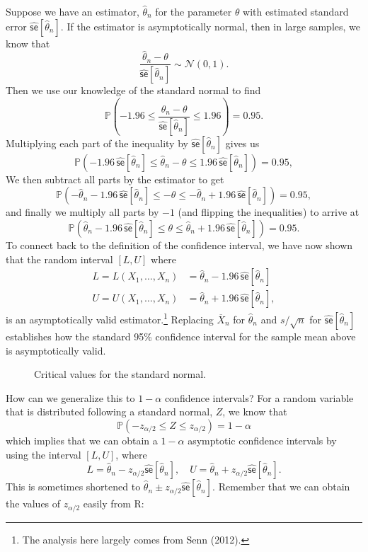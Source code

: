 \documentclass[
  13pt,
  letterpaper,
  DIV=11,
  numbers=noendperiod]{scrreprt}
\newcommand{\N}{\mathcal{N}}
\newcommand{\se}{\textsf{se}}
\renewcommand{\P}{\mathbb{P}}
\newcommand{\Xbar}{\overline{X}}
\theoremstyle{definition}
\theoremstyle{definition}
\theoremstyle{plain}
\theoremstyle{remark}
\begin{document}
Suppose we have an estimator, \(\widehat{\theta}_n\) for the parameter
\(\theta\) with estimated standard error
\(\widehat{\se}[\widehat{\theta}_n]\). If the estimator is
asymptotically normal, then in large samples, we know that \[ 
\frac{\widehat{\theta}_n - \theta}{\widehat{\se}[\widehat{\theta}_n]} \sim \N(0, 1).
\] Then we use our knowledge of the standard normal to find \[ 
\P\left( -1.96 \leq \frac{\widehat{\theta}_n - \theta}{\widehat{\se}[\widehat{\theta}_n]} \leq 1.96\right) = 0.95.
\] Multiplying each part of the inequality by
\(\widehat{\se}[\widehat{\theta}_n]\) gives us \[ 
\P\left( -1.96\,\widehat{\se}[\widehat{\theta}_n] \leq \widehat{\theta}_n - \theta \leq 1.96\,\widehat{\se}[\widehat{\theta}_n]\right) = 0.95,
\] We then subtract all parts by the estimator to get \[ 
\P\left(-\widehat{\theta}_n - 1.96\,\widehat{\se}[\widehat{\theta}_n] \leq - \theta \leq -\widehat{\theta}_n + 1.96\,\widehat{\se}[\widehat{\theta}_n]\right) = 0.95,
\] and finally we multiply all parts by \(-1\) (and flipping the
inequalities) to arrive at \[ 
\P\left(\widehat{\theta}_n - 1.96\,\widehat{\se}[\widehat{\theta}_n] \leq \theta \leq \widehat{\theta}_n + 1.96\,\widehat{\se}[\widehat{\theta}_n]\right) = 0.95.
\] To connect back to the definition of the confidence interval, we have
now shown that the random interval \([L, U]\) where \[ 
\begin{aligned}
  L = L(X_1, \ldots, X_n) &= \widehat{\theta}_n - 1.96\,\widehat{\se}[\widehat{\theta}_n] \\
  U = U(X_1, \ldots, X_n) &= \widehat{\theta}_n + 1.96\,\widehat{\se}[\widehat{\theta}_n],
\end{aligned}
\] is an asymptotically valid estimator.\footnote{The analysis here
  largely comes from Senn (2012).} Replacing \(\Xbar_n\) for
\(\widehat{\theta}_n\) and \(s/\sqrt{n}\) for
\(\widehat{\se}[\widehat{\theta}_n]\) establishes how the standard 95\%
confidence interval for the sample mean above is asymptotically valid.

\begin{figure}[th]


\caption{\label{fig-std-normal}Critical values for the standard normal.}

\end{figure}%

How can we generalize this to \(1-\alpha\) confidence intervals? For a
random variable that is distributed following a standard normal, \(Z\),
we know that \[ 
\P(-z_{\alpha/2} \leq Z \leq z_{\alpha/2}) = 1-\alpha
\] which implies that we can obtain a \(1-\alpha\) asymptotic confidence
intervals by using the interval \([L, U]\), where \[ 
L = \widehat{\theta}_{n} - z_{\alpha/2} \widehat{\se}[\widehat{\theta}_{n}], \quad U = \widehat{\theta}_{n} + z_{\alpha/2} \widehat{\se}[\widehat{\theta}_{n}]. 
\] This is sometimes shortened to
\(\widehat{\theta}_n \pm z_{\alpha/2} \widehat{\se}[\widehat{\theta}_{n}]\).
Remember that we can obtain the values of \(z_{\alpha/2}\) easily from
R:
\end{document}
